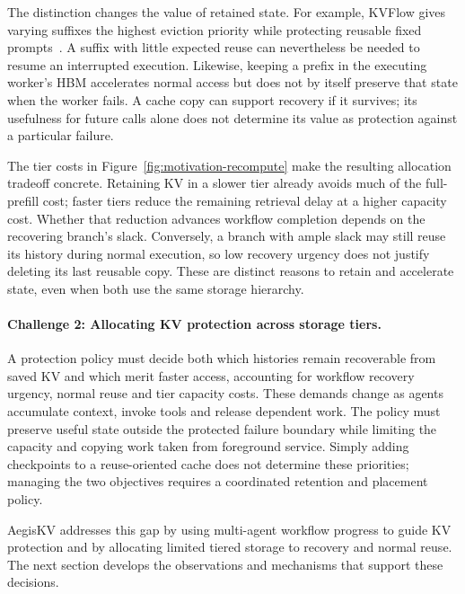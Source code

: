 The distinction changes the value of retained state. For example,
KVFlow gives varying suffixes the highest eviction priority while
protecting reusable fixed prompts~\cite{pan2025kvflow}. A suffix with
little expected reuse can nevertheless be needed to resume an
interrupted execution. Likewise, keeping a prefix in the executing
worker's HBM accelerates normal access but does not by itself preserve
that state when the worker fails. A cache copy can support recovery if
it survives; its usefulness for future calls alone does not determine
its value as protection against a particular failure.

\label{sec:motivation-long-context}
The tier costs in Figure~\ref{fig:motivation-recompute} make the resulting
allocation tradeoff concrete. Retaining KV in a slower tier already
avoids much of the full-prefill cost; faster tiers reduce the remaining
retrieval delay at a higher capacity cost. Whether that reduction
advances workflow completion depends on the recovering branch's slack.
Conversely, a branch with ample slack may still reuse its history during
normal execution, so low recovery urgency does not justify deleting its
last reusable copy. These are distinct reasons to retain and accelerate
state, even when both use the same storage hierarchy.

\paragraph{Challenge 2: Allocating KV protection across storage tiers.}
A protection policy must decide both which histories remain recoverable
from saved KV and which merit faster access, accounting for workflow
recovery urgency, normal reuse and tier capacity costs. These demands
change as agents accumulate context, invoke tools and release dependent
work. The policy must preserve useful state outside the protected
failure boundary while limiting the capacity and copying work taken
from foreground service. Simply adding checkpoints to a reuse-oriented
cache does not determine these priorities; managing the two objectives
requires a coordinated retention and placement policy.

\label{sec:motivation-goals}
AegisKV addresses this gap by using multi-agent workflow progress to
guide KV protection and by allocating limited tiered storage to recovery
and normal reuse. The next section develops the observations and
mechanisms that support these decisions.
